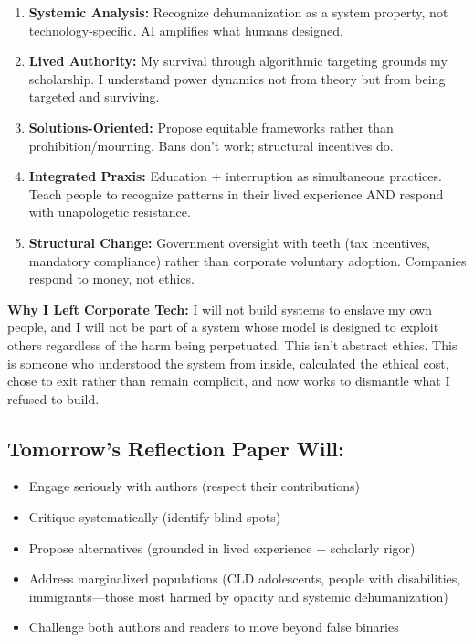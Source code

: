 \documentclass[12pt,letterpaper]{article}
\begin{document}
\begin{enumerate}[leftmargin=*]
    \item \textbf{Systemic Analysis:} Recognize dehumanization as a system property, not technology-specific. AI amplifies what humans designed.
    
    \item \textbf{Lived Authority:} My survival through algorithmic targeting grounds my scholarship. I understand power dynamics not from theory but from being targeted and surviving.
    
    \item \textbf{Solutions-Oriented:} Propose equitable frameworks rather than prohibition/mourning. Bans don't work; structural incentives do.
    
    \item \textbf{Integrated Praxis:} Education + interruption as simultaneous practices. Teach people to recognize patterns in their lived experience AND respond with unapologetic resistance.
    
    \item \textbf{Structural Change:} Government oversight with teeth (tax incentives, mandatory compliance) rather than corporate voluntary adoption. Companies respond to money, not ethics.
\end{enumerate}

\begin{personalreflection}
\textbf{Why I Left Corporate Tech:} I will not build systems to enslave my own people, and I will not be part of a system whose model is designed to exploit others regardless of the harm being perpetuated. This isn't abstract ethics. This is someone who understood the system from inside, calculated the ethical cost, chose to exit rather than remain complicit, and now works to dismantle what I refused to build.
\end{personalreflection}

\subsection*{Tomorrow's Reflection Paper Will:}

\begin{itemize}[leftmargin=*,noitemsep]
    \item Engage seriously with authors (respect their contributions)
    \item Critique systematically (identify blind spots)
    \item Propose alternatives (grounded in lived experience + scholarly rigor)
    \item Address marginalized populations (CLD adolescents, people with disabilities, immigrants—those most harmed by opacity and systemic dehumanization)
    \item Challenge both authors and readers to move beyond false binaries
\end{itemize}
\end{document}
